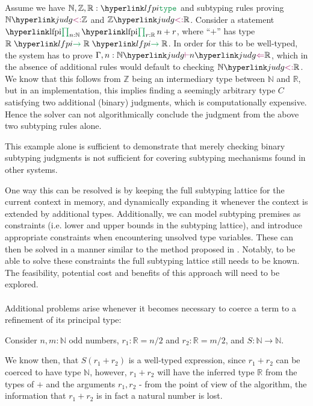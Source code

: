 \begin{example}\label{ex:lf:lfx:sub:ex1}
	Assume we have $\mathbb N,\mathbb Z,\mathbb R:\type$ and subtyping rules proving $\subtp{\mathbb N}{\mathbb Z}$ and $\subtp{\mathbb Z}{\mathbb R}$. Consider a statement $\lfpi{n:\mathbb N}{\lfpi{r:\mathbb R}{n+r}}$, where ``$+$'' has type $\lfarrow{\mathbb R}{\lfarrow{\mathbb R}{\mathbb R}}$. In order for this to be well-typed, the system has to prove $\judg{\Gamma,n:\mathbb N}{\hastype n{\mathbb R}}$, which in the absence of additional rules would default to checking $\subtp{\mathbb N}{\mathbb R}$. We know that this follows from $\mathbb Z$ being an intermediary type between $\mathbb N$ and $\mathbb R$, but in an implementation, this implies finding a seemingly arbitrary type $C$ satisfying two additional (binary) judgments, which is computationally expensive. Hence the solver	can not algorithmically conclude the judgment from the above two subtyping rules alone.
\end{example}

This example alone is sufficient to demonstrate that merely checking binary subtyping judgments is not sufficient for covering subtyping mechanisms found in other systems.

One way this can be resolved is by keeping the full subtyping lattice for the current context in memory, and dynamically expanding it whenever the context is extended by additional types. Additionally, we can model subtyping premises as constraints (i.e. lower and upper bounds in the subtyping lattice), and introduce appropriate constraints when encountering unsolved type variables. These can then be solved in a manner similar to the method proposed in \cite{KoPf:uialcw93}. Notably, to be able to solve these constraints the full subtyping lattice still needs to be known. The feasibility, potential cost and benefits of this approach will need to be explored.

\paragraph{} Additional problems arise whenever it becomes necessary to coerce a term to a refinement of its principal type:
\begin{example}
	Consider $n,m:\mathbb N$ odd numbers, $r_1:\mathbb R= n/2$ and $r_2:\mathbb R=m/2$, and $S:\mathbb N\to\mathbb N$.
	
	We know then, that $S(r_1+r_2)$ is a well-typed expression, since $r_1+r_2$ can be coerced to have type $\mathbb N$, however, $r_1+r_2$ will have the inferred type $\mathbb R$ from the types of $+$ and the arguments $r_1,r_2$ - from the point of view of the algorithm, the information that $r_1+r_2$ is in fact a natural number is lost.
\end{example}

